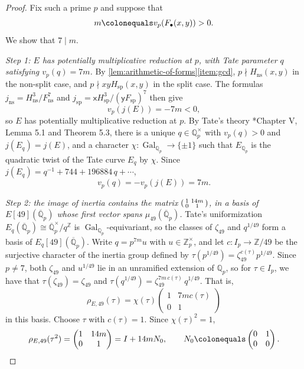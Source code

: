\documentclass[12pt]{amsart}
\newcommand{\Q}{\mathbb{Q}}
\newcommand{\Z}{\mathbb{Z}}
\newcommand{\Qbar}{{\overline{\Q}}}
\newcommand{\x}{\mathsf{x}}
\newcommand{\y}{\mathsf{y}}
\DeclareMathOperator{\ns}{ns}
\DeclareMathOperator{\spc}{sp}
\DeclareMathOperator{\Gal}{Gal}
\numberwithin{equation}{section}
\theoremstyle{definition}
\begin{document}
\begin{proof}
  Fix such a prime $p$ and suppose that
  \[
    m \colonequals v_p(F_{\bullet}(x,y)) > 0 .
  \]
  We show that $7 \mid m$.

  \emph{Step 1: $E$ has potentially multiplicative reduction at $p$, with
    Tate parameter $q$ satisfying $v_p(q) = 7m$.} By
  \cref{lem:arithmetic-of-forms}\eqref{item:gcd}, $p \nmid H_{\ns}(x,y)$ in
  the non-split case, and $p \nmid xyH_{\spc}(x,y)$ in the split case. The
  formulas $j_{\ns} = H_{\ns}^{3}/F_{\ns}^{7}$ and
  $j_{\spc} = \x H_{\spc}^{3}/(\y F_{\spc})^{7}$ then give
  \[
    v_p(j(E)) = -7m < 0,
  \]
  so $E$ has potentially multiplicative reduction at $p$. By Tate's theory
  \cite{Silverman-94}*{Chapter V, Lemma 5.1 and Theorem 5.3}, there is a
  unique $q \in \Q_p^{\times}$ with $v_p(q) > 0$ and $j(E_q) = j(E)$, and a
  character $\chi \colon \Gal_{\Q_p} \to \{\pm 1\}$ such that $E_{\Q_p}$ is the
  quadratic twist of the Tate curve $E_q$ by $\chi$. Since
  $j(E_q) = q^{-1} + 744 + 196884\,q + \cdots$,
  \[
    v_p(q) = -v_p(j(E)) = 7m .
  \]

  \emph{Step 2: the image of inertia contains the matrix
    $\begin{psmallmatrix*} 1 & 14m \\ 0 & 1\end{psmallmatrix*}$, in a basis of
    $E[49](\Qbar_p)$ whose first vector spans $\mu_{49}(\Qbar_p)$.} Tate's
  uniformization $E_q(\Qbar_p) \cong \Qbar_p^{\times}/q^{\Z}$ is
  $\Gal_{\Q_p}$-equivariant, so the classes of $\zeta_{49}$ and $q^{1/49}$ form a
  basis of $E_q[49](\Qbar_p)$. Write $q = p^{7m}u$ with $u \in \Z_p^{\times}$, and let
  $c \colon I_p \to \Z/49$ be the surjective character of the inertia group
  defined by $\tau(p^{1/49}) = \zeta_{49}^{c(\tau)}p^{1/49}$. Since $p \neq 7$, both
  $\zeta_{49}$ and $u^{1/49}$ lie in an unramified extension of $\Q_p$, so for
  $\tau \in I_p$, we have that $\tau(\zeta_{49}) = \zeta_{49}$ and
  $\tau(q^{1/49}) = \zeta_{49}^{7m\,c(\tau)}\,q^{1/49}$. That is,
  \[
    \rho_{E,49}(\tau) = \chi(\tau)\begin{pmatrix*} 1 & 7m c(\tau) \\ 0 & 1 \end{pmatrix*}
  \]
  in this basis. Choose $\tau$ with $c(\tau) = 1$. Since $\chi(\tau)^2 = 1$,
  \[
    \rho_{E,49}(\tau^2) = \begin{pmatrix*} 1 & 14m \\ 0 & 1 \end{pmatrix*}
    = I + 14m N_0,
    \qquad
    N_0 \colonequals \begin{pmatrix*}[r] 0 & 1 \\ 0 & 0 \end{pmatrix*} .
  \]


\end{proof}
\end{document}
